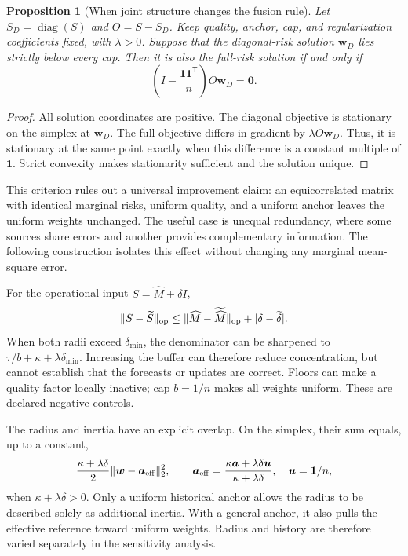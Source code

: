 \documentclass[10pt]{article}
\newtheorem{proposition}{Proposition}
\begin{document}
\begin{proposition}[When joint structure changes the fusion rule]
\label{prop:joint-structure-criterion}
Let $S_D=\operatorname{diag}(S)$ and $O=S-S_D$. Keep quality, anchor, cap,
and regularization coefficients fixed, with $\lambda>0$. Suppose that the
diagonal-risk solution $\boldsymbol w_D$ lies strictly below every cap. Then
it is also the full-risk solution if and only if
\begin{equation}
 \left(I-\frac{\boldsymbol1\boldsymbol1^{\mathsf T}}{n}\right)
 O\boldsymbol w_D=\boldsymbol0.
 \label{eq:joint-structure-condition}
\end{equation}
\end{proposition}

\begin{proof}
All solution coordinates are positive. The diagonal objective is stationary
on the simplex at $\boldsymbol w_D$. The full objective differs in gradient
by $\lambda O\boldsymbol w_D$. Thus, it is stationary at the same point
exactly when this difference is a constant multiple of $\boldsymbol1$.
Strict convexity makes stationarity sufficient and the solution unique.
\end{proof}

This criterion rules out a universal improvement claim: an equicorrelated
matrix with identical marginal risks, uniform quality, and a uniform anchor
leaves the uniform weights unchanged.
The useful case is unequal redundancy, where some sources share errors and
another provides complementary information. The following construction
isolates this effect without changing any marginal mean-square error.

For the operational input $S=\widehat M+\delta I$,
\begin{equation}
 \|S-\widetilde S\|_{\rm op}
 \le\|\widehat M-\widetilde{\widehat M}\|_{\rm op}
       +|\delta-\widetilde\delta|.
\end{equation}
When both radii exceed $\delta_{\min}$, the denominator can be sharpened to
$\tau/b+\kappa+\lambda\delta_{\min}$. Increasing the buffer can therefore
reduce concentration, but cannot establish that the forecasts or updates are
correct. Floors can make a quality factor locally inactive; cap $b=1/n$ makes
all weights uniform. These are declared negative controls.

The radius and inertia have an explicit overlap. On the simplex, their
sum equals, up to a constant,
\begin{equation}
 \frac{\kappa+\lambda\delta}{2}\|\boldsymbol w-\boldsymbol a_{\rm eff}\|_2^2,
 \qquad
 \boldsymbol a_{\rm eff}=
 \frac{\kappa\boldsymbol a+\lambda\delta\boldsymbol u}
      {\kappa+\lambda\delta},\quad \boldsymbol u=\boldsymbol1/n,
\end{equation}
when $\kappa+\lambda\delta>0$. Only a uniform historical anchor allows the
radius to be described solely as additional inertia. With a general anchor,
it also pulls the effective reference toward uniform weights. Radius and
history are therefore varied separately in the sensitivity analysis.
\end{document}
